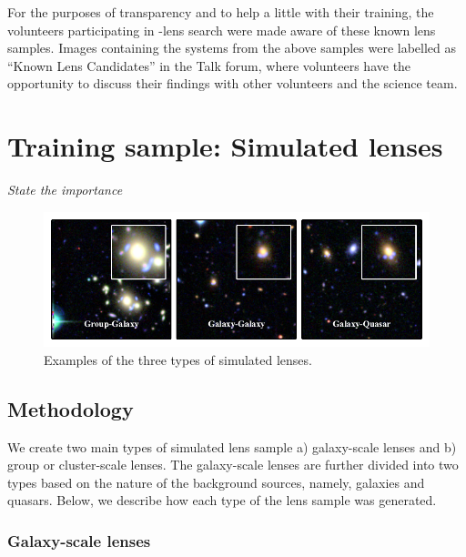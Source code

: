 \documentclass[useAMS,usenatbib,a4paper]{mn2e}
\begin{document}
For the purposes of transparency and to help a little with their training, 
the volunteers participating in \sw-\cfhtls lens search were made aware of
these known lens samples. Images containing the systems from the above samples
were labelled as ``Known Lens Candidates'' in the Talk forum, where volunteers
have the opportunity to discuss their findings with other volunteers and the
science team. 



\section{Training sample: Simulated lenses}
\label{sec:ts}

{\it State the importance}

\begin{figure}
\begin{center}
\includegraphics[scale=1.0]{sw-cfhtls-figs/sim_cgq.pdf}
\caption{ \label{fig:sim}
Examples of the three types of simulated lenses.
}
\end{center}
\end{figure}


\subsection{Methodology}
\label{sec:simmethod}

We create two main types of simulated lens sample a) galaxy-scale lenses and b)
group or cluster-scale lenses. The galaxy-scale lenses are further divided into two
types based on the nature of the background sources, namely, galaxies and
quasars. Below, we describe how each type of the lens sample was generated.


\subsubsection{Galaxy-scale lenses} 
\label{sect:gallens}
\end{document}
